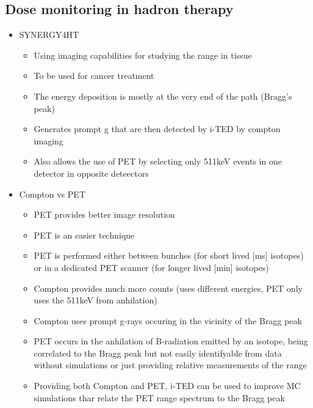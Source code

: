\subsection{Dose monitoring in hadron therapy}

\begin{itemize}
    \item SYNERGY4HT
    \begin{itemize}
        \item Using imaging capabilities for studying the range in tissue
        \item To be used for cancer treatment 
        \item The energy deposition is mostly at the very end of the path (Bragg's peak)
        \item Generates prompt g that are then detected by i-TED by compton imaging
        \item Also allows the use of PET by selecting only 511keV events in one detector in opposite deteectors
    \end{itemize}
    \item Compton vs PET
    \begin{itemize}
        \item PET provides better image resolution
        \item PET is an easier technique
        \item PET is performed either between bunches (for short lived [ms] isotopes) or in a dedicated PET scanner (for longer lived [min] isotopes)
        \item Compton provides much more counts (uses different energies, PET only uses the 511keV from anhilation)
        \item Compton uses prompt g-rays occuring in the vicinity of the Bragg peak
        \item PET occurs in the anhilation of B-radiation emitted by an isotope, being correlated to the Bragg peak but not easily identifyable from data without simulations or just providing relative measurements of the range
        \item Providing both Compton and PET, i-TED can be used to improve MC simulations thar relate the PET range spectrum to the Bragg peak
    \end{itemize}
\end{itemize}

